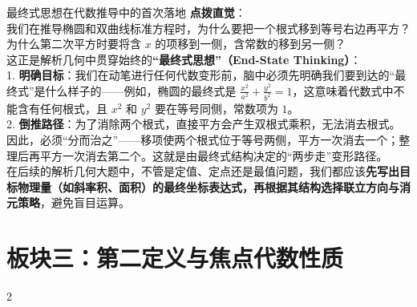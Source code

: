 \documentclass[11pt,a4paper]{ctexart}
\begin{document}
\begin{teachbox}{最终式思想在代数推导中的首次落地}
\textbf{点拨直觉}：\\
我们在推导椭圆和双曲线标准方程时，为什么要把一个根式移到等号右边再平方？为什么第二次平方时要将含 $x$ 的项移到一侧，含常数的移到另一侧？\\
这正是解析几何中贯穿始终的\textbf{“最终式思想”（End-State Thinking）}：\\
1. \textbf{明确目标}：我们在动笔进行任何代数变形前，脑中必须先明确我们要到达的“最终式”是什么样子的——例如，椭圆的最终式是 $\frac{x^2}{a^2}+\frac{y^2}{b^2}=1$，这意味着代数式中不能含有任何根式，且 $x^2$ 和 $y^2$ 要在等号同侧，常数项为 $1$。\\
2. \textbf{倒推路径}：为了消除两个根式，直接平方会产生双根式乘积，无法消去根式。因此，必须“分而治之”——移项使两个根式位于等号两侧，平方一次消去一个；整理后再平方一次消去第二个。这就是由最终式结构决定的“两步走”变形路径。\\
在后续的解析几何大题中，不管是定值、定点还是最值问题，我们都应该\textbf{先写出目标物理量（如斜率积、面积）的最终坐标表达式，再根据其结构选择联立方向与消元策略}，避免盲目运算。
\end{teachbox}



\newpage

\section{板块三：第二定义与焦点代数性质}

{\small \qConicDefTwoDerivationStem}
\begin{center}
  \qConicDefTwoDerivationFigure
\end{center}

\begin{paracol}{2}
\switchcolumn
{}
\end{paracol}
\end{document}
